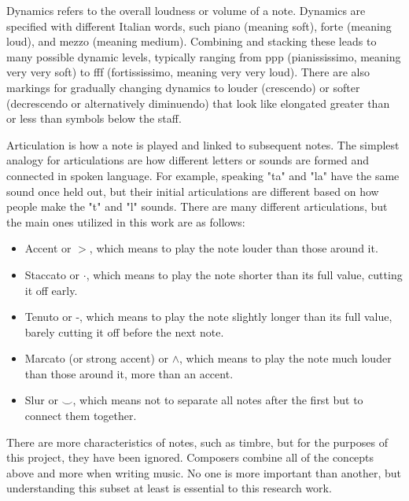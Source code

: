 \documentclass[10pt,preprint]{sigplanconf}
\begin{document}
{Dynamics refers to the overall loudness or volume of a note. Dynamics are specified with different Italian words, such piano (meaning soft), forte (meaning loud), and mezzo (meaning medium). Combining and stacking these leads to many possible dynamic levels, typically ranging from ppp (pianississimo, meaning very very soft) to fff (fortississimo, meaning very very loud). There are also markings for gradually changing dynamics to louder (crescendo) or softer (decrescendo or alternatively diminuendo) that look like elongated greater than or less than symbols below the staff.

Articulation is how a note is played and linked to subsequent notes. The simplest analogy for articulations are how different letters or sounds are formed and connected in spoken language. For example, speaking "ta" and "la" have the same sound once held out, but their initial articulations are different based on how people make the "t" and "l" sounds. There are many different articulations, but the main ones utilized in this work are as follows:

\begin{itemize}
\item Accent or $>$, which means to play the note louder than those around it.
\item Staccato or $\cdot$, which means to play the note shorter than its full value, cutting it off early.
\item Tenuto or -, which means to play the note slightly longer than its full value, barely cutting it off before the next note.
\item Marcato (or strong accent) or $\wedge$, which means to play the note much louder than those around it, more than an accent.
\item Slur or $\smile$, which means not to separate all notes after the first but to connect them together.
\end{itemize}

There are more characteristics of notes, such as timbre, but for the purposes of this project, they have been ignored. Composers combine all of the concepts above and more when writing music. No one is more important than another, but understanding this subset at least is essential to this research work.


}
\end{document}

